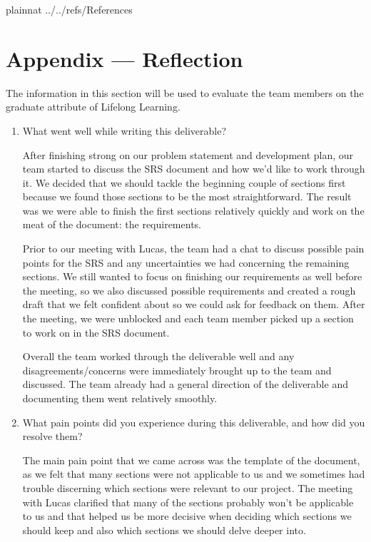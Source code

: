 \documentclass[12pt]{article}
\begin{document}
\newpage

 {plainnat}
 {../../refs/References}

\newpage


\newpage{}
\section*{Appendix --- Reflection}

The information in this section will be used to evaluate the team members on the
graduate attribute of Lifelong Learning.  

\begin{enumerate}
  \item What went well while writing this deliverable? 

  After finishing strong on our problem statement and development plan, our team started to discuss the SRS document and how we’d like to work through it. We decided that we should tackle the beginning couple of sections first because we found those sections to be the most straightforward. The result was we were able to finish the first sections relatively quickly and work on the meat of the document: the requirements. 

  Prior to our meeting with Lucas, the team had a chat to discuss possible pain points for the SRS and any uncertainties we had concerning the remaining sections. We still wanted to focus on finishing our requirements as well before the meeting, so we also discussed possible requirements and created a rough draft that we felt confident about so we could ask for feedback on them. After the meeting, we were unblocked and each team member picked up a section to work on in the SRS document.

  Overall the team worked through the deliverable well and any disagreements/concerns were immediately brought up to the team and discussed. The team already had a general direction of the deliverable and documenting them went relatively smoothly.  


  \item What pain points did you experience during this deliverable, and how did
  you resolve them?

  The main pain point that we came across was the template of the document, as we felt that many sections were not applicable to us and we sometimes had trouble discerning which sections were relevant to our project. The meeting with Lucas clarified that many of the sections probably won’t be applicable to us and that helped us be more decisive when deciding which sections we should keep and also which sections we should delve deeper into. 


\end{enumerate}
\end{document}
